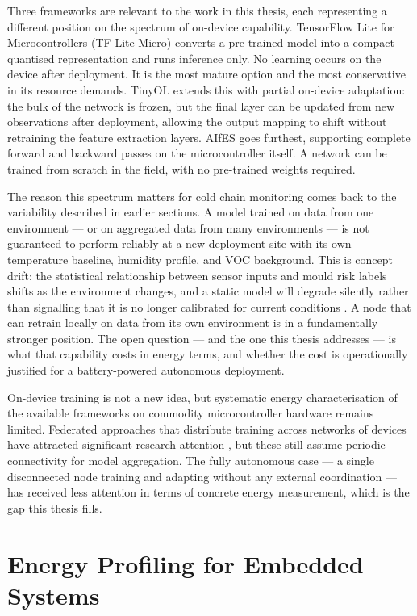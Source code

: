 Three frameworks are relevant to the work in this thesis, each representing a different position on the spectrum of on-device capability. TensorFlow Lite for Microcontrollers (TF Lite Micro) \cite{David2021} converts a pre-trained model into a compact quantised representation and runs inference only. No learning occurs on the device after deployment. It is the most mature option and the most conservative in its resource demands. TinyOL \cite{Disabato2021} extends this with partial on-device adaptation: the bulk of the network is frozen, but the final layer can be updated from new observations after deployment, allowing the output mapping to shift without retraining the feature extraction layers. AIfES \cite{Wulfert2024} goes furthest, supporting complete forward and backward passes on the microcontroller itself. A network can be trained from scratch in the field, with no pre-trained weights required.

The reason this spectrum matters for cold chain monitoring comes back to the variability described in earlier sections. A model trained on data from one environment --- or on aggregated data from many environments --- is not guaranteed to perform reliably at a new deployment site with its own temperature baseline, humidity profile, and VOC background. This is concept drift: the statistical relationship between sensor inputs and mould risk labels shifts as the environment changes, and a static model will degrade silently rather than signalling that it is no longer calibrated for current conditions \cite{Bayram2022, Ilic2023}. A node that can retrain locally on data from its own environment is in a fundamentally stronger position. The open question --- and the one this thesis addresses --- is what that capability costs in energy terms, and whether the cost is operationally justified for a battery-powered autonomous deployment.

On-device training is not a new idea, but systematic energy characterisation of the available frameworks on commodity microcontroller hardware remains limited. Federated approaches that distribute training across networks of devices have attracted significant research attention \cite{Ficco2024}, but these still assume periodic connectivity for model aggregation. The fully autonomous case --- a single disconnected node training and adapting without any external coordination --- has received less attention in terms of concrete energy measurement, which is the gap this thesis fills.

\section{Energy Profiling for Embedded Systems}

